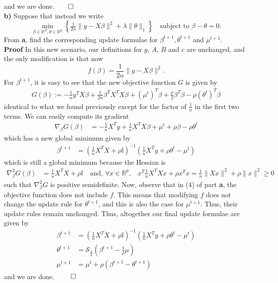 \documentclass[10pt]{article}
\newcommand{\bp}[1]{\left({#1}\right)}
\newcommand{\mbb}[1]{\mathbb{#1}}
\newcommand{\1}[1]{\mathbbm{1}_{#1}}
\begin{document}
and we are done.\hfill{$\qed$}\\[5pt]
{\bf b)} Suppose that instead we write
    \[\min_{\beta\in\mbb{R}^P,\theta\in\mbb{R}^p}\left\{\tfrac{1}{2n}\|y-X\beta\|^2+\lambda\|\theta\|_1\right\}\quad\text{subject to $\beta-\theta=0$}.\]
From {\bf a}, find the corresponding update formulae for $\beta^{t+1},\theta^{t+1}$ and $\mu^{t+1}$.\\[5pt]
{\bf Proof}\hspace{5pt} In this new scenario, our definitions for $g$, $A$, $B$ and $c$ are unchanged, and the only modification is that now
\[f(\beta)=\frac{1}{2n}\|y-X\beta\|^2.\]
For $\beta^{t+1}$, it is easy to see that the new objective function $G$ is given by
\begin{align*}
    G(\beta):=-\frac{1}{n}y^TX\beta+\frac{1}{2n}\beta^TX^TX\beta+(\mu^t)^T\beta+\frac{\rho}{2}\beta^T\beta-\rho(\theta^t)^T\beta
\end{align*}
identical to what we found previously except for the factor of $\tfrac{1}{n}$ in the first two terms. We can easily compute its gradient
\begin{align*}
    \nabla_\beta G(\beta)&=-\frac{1}{n}X^Ty+\frac{1}{n}X^TX\beta+\mu^t+\rho\beta-\rho\theta^t
\end{align*}
which has a new global minimum given by
\begin{align*}
    \beta^{t+1}&=\bp{\frac{1}{n}X^TX+\rho\mbb{I}}^{-1}\bp{\frac{1}{n}X^Ty+\rho\theta^t-\mu^t}
\end{align*}
which is still a global minimum because the Hessian is
\begin{align*}
    \nabla^2_\beta G(\beta)&=\frac{1}{n}X^TX+\rho\mbb{I}\quad\text{and, $\forall x\in \mbb{R}^p$,}\quad x^T\frac{1}{n}X^TXx+\rho x^Tx=\frac{1}{n}\|Xx\|^2+\rho\|x\|^2\geq 0
\end{align*}
such that $\nabla^2_\beta G$ is positive semidefinite. Now, observe that in (4) of part {\bf a}, the objective function does not include $f$. This means that modifying $f$ does not change the update rule for $\theta^{t+1}$, and this is
also the case for $\mu^{t+1}$. Thus, their update rules remain unchanged. Thus, altogether our final update formulae are given by
\begin{align*}
    \beta^{t+1}&=\bp{\frac{1}{n}X^TX+\rho\mbb{I}}^{-1}\bp{\frac{1}{n}X^Ty+\rho\theta^t-\mu^t}\\
    \theta^{t+1}&=\mathcal{S}_{\frac{\lambda}{\rho}}\bp{\beta^{t+1}-\frac{1}{\rho}\mu}\\
    \mu^{t+1}&=\mu^t+\rho(\beta^{t+1}-\theta^{t+1})
\end{align*}
and we are done. \hfill{$\qed$}
\end{document}
